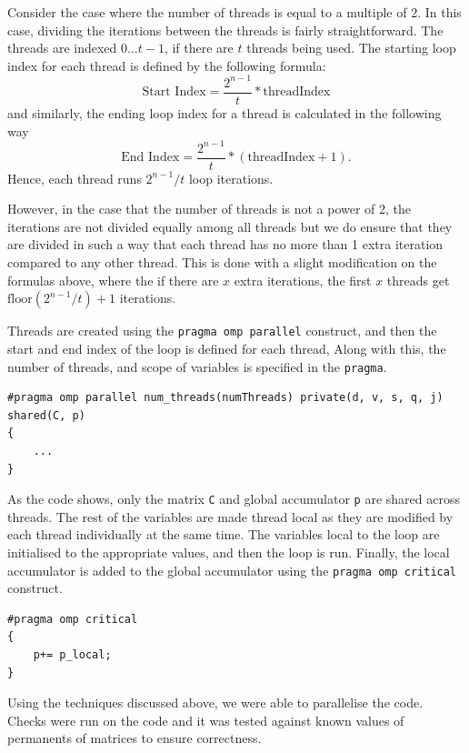 \documentclass[11pt]{article}
\theoremstyle{theorem}
\theoremstyle{remark}
\theoremstyle{plain}
\theoremstyle{definition}
\begin{document}
Consider the case where the number of threads is equal to a multiple of 2. In this case, dividing the iterations between the threads is fairly straightforward. The threads are indexed $0 ... t-1$, if there are $t$ threads being used. The starting loop index for each thread is defined by the following formula:
\begin{equation}
\text{Start Index} = \frac{2^{n-1}}{t} * \text{threadIndex}
\end{equation}
and similarly, the ending loop index for a thread is calculated in the following way
\begin{equation}
\text{End Index} = \frac{2^{n-1}}{t} * (\text{threadIndex} + 1).
\end{equation}
Hence, each thread runs $ {2^{n-1}}/{t} $ loop iterations.

However, in the case that the number of threads is not a power of 2, the iterations are not divided equally among all threads but we do ensure that they are divided in such a way that each thread has no more than 1 extra iteration compared to any other thread. This is done with a slight modification on the formulas above, where the if there are $x$ extra iterations, the first $x$ threads get $\text{floor}( {2^{n-1}}/{t} ) + 1$ iterations.

Threads are created using the \texttt{pragma omp parallel} construct, and then the start and end index of the loop is defined for each thread, Along with this, the number of threads, and scope of variables is specified in the \texttt{pragma}.
\begin{verbatim}
#pragma omp parallel num_threads(numThreads) private(d, v, s, q, j) shared(C, p)
{
    ...
}
\end{verbatim}
As the code shows, only the matrix \texttt{C} and global accumulator \texttt{p} are shared across threads. The rest of the variables are made thread local as they are modified by each thread individually at the same time. The variables local to the loop are initialised to the appropriate values, and then the loop is run. Finally, the local accumulator is added to the global accumulator using the \texttt{pragma omp critical} construct.
\begin{verbatim}
#pragma omp critical
{
    p+= p_local;
}
\end{verbatim}
Using the techniques discussed above, we were able to parallelise the code. Checks were run on the code and it was tested against known values of permanents of matrices to ensure correctness.
\end{document}
